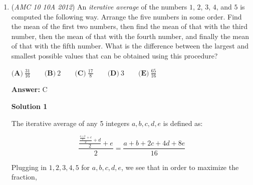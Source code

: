 \begin{enumerate}
 Therefore there would be 151 regular years and 49 leap years, so $1(151)+2(49)$ = $249$ days back.  Since $249 \equiv 4\ (\text{mod}\ 7)$, four days back from Tuesday would be $\boxed{\textbf{(A)}\ \text{Friday}}$.

 



\textbf{Solution 2}

Since they say that February $7$th, $2012$ is the $200$th anniversary of Charles Dickens birthday, that means that the birth of Charles Dickens is on February $7$th, $1812$. We then see that there is a leap year on $1812, 1816, ...., 2008$ but we must exclude $1900$ which equates to $49$ leap years. So, the amount of days we have to go back is $200(365) + 49$ days which in $\text{mod }7$ gives us 4. Thus, $4$ days back from Tuesday is $\boxed{\textbf{(A)}\ \text{Friday}}$.

 


 \textbf{Remark} The reason why there are 49 leap years:

 $\quad$ There are 200 $\div$ 4  years which are divisible by 4. There are 2 years which are divisible by 100 within these 200 years. There is 1 year which is divisible by 400. Therefore , there are $\frac{200}{4} -2 + 1$ leap years.

 


	\item (\textit{AMC 10 10A 2012}) An \textit{iterative average} of the numbers $1$, $2$, $3$, $4$, and $5$ is computed the following way. Arrange the five numbers in some order. Find the mean of the first two numbers, then find the mean of that with the third number, then the mean of that with the fourth number, and finally the mean of that with the fifth number. What is the difference between the largest and smallest possible values that can be obtained using this procedure?


 $\textbf{(A)}\ \frac{31}{16}\qquad\textbf{(B)}\ 2\qquad\textbf{(C)}\ \frac{17}{8}\qquad\textbf{(D)}\ 3\qquad\textbf{(E)}\ \frac{65}{16}$

 \textbf{Answer: }C



\textbf{Solution 1}

The iterative average of any 5 integers $a,b,c,d,e$ is defined as:

 
 \[\frac{\frac{\frac{\frac{a+b} 2+c} 2+d} 2+e} 2=\frac{a+b+2c+4d+8e}{16}\]

 
Plugging in $1,2,3,4,5$ for $a,b,c,d,e$, we see that in order to maximize the fraction,


\end{enumerate}
